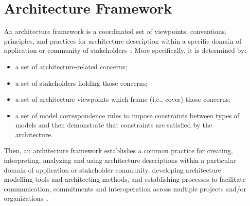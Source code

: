 \section{Architecture Framework}\label{sec:AAF}




An architecture framework is a
coordinated set of viewpoints, conventions, principles, and practices
for architecture description within a specific domain of application
or community of stakeholders~\cite{42010}.  More specifically, it is determined by: 

\begin{itemize}
\item a set of architecture-related concerns;
\item a set of stakeholders holding those concerns;
\item a set of architecture viewpoints which frame (i.e.,
cover) those concerns;
\item a set of model correspondence rules to impose constraints between
types of models and then demonstrate that constraints
are satisfied by the architecture.
\end{itemize}

Then, an architecture framework establishes a common practice for creating, interpreting, analyzing and using architecture descriptions within a particular domain of application or stakeholder community, developing
architecture modelling tools and architecting methods, and establishing processes to facilitate communication, commitments and interoperation across multiple projects and/or organizations~\cite{42010}. 

